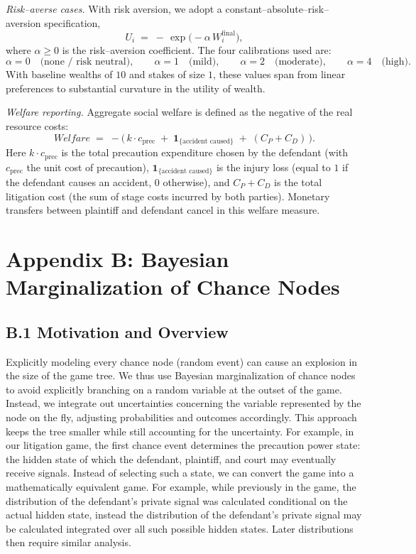 \documentclass{article}
\begin{document}
\emph{Risk–averse cases.} With risk aversion, we adopt a constant–absolute–risk–aversion specification,
\[
U_i \;=\; -\,\exp\!\bigl(-\alpha\,W_i^{\mathrm{final}}\bigr),
\]
where $\alpha\ge 0$ is the risk–aversion coefficient. The four calibrations used are:
\[
\alpha = 0 \quad\text{(none / risk neutral)},\qquad
\alpha = 1 \quad\text{(mild)},\qquad
\alpha = 2 \quad\text{(moderate)},\qquad
\alpha = 4 \quad\text{(high)}.
\]
With baseline wealths of $10$ and stakes of size $1$, these values span from linear preferences to substantial curvature in the utility of wealth.

\emph{Welfare reporting.} Aggregate social welfare is defined as the negative of the real resource costs:
\[
Welfare \;=\; -\bigl(\,k \cdot c_{\mathrm{prec}} \;+\; \mathbf{1}_{\{\text{accident caused}\}} \;+\; (C_P+C_D)\,\bigr).
\]
Here $k \cdot c_{\mathrm{prec}}$ is the total precaution expenditure chosen by the defendant (with $c_{\mathrm{prec}}$ the unit cost of precaution), $\mathbf{1}_{\{\text{accident caused}\}}$ is the injury loss (equal to $1$ if the defendant causes an accident, $0$ otherwise), and $C_P+C_D$ is the total litigation cost (the sum of stage costs incurred by both parties). Monetary transfers between plaintiff and defendant cancel in this welfare measure.

\section*{Appendix B: Bayesian Marginalization of Chance Nodes}

\subsection*{B.1 Motivation and Overview}

Explicitly modeling every chance node (random event) can cause an explosion in the size of the game tree. We thus use Bayesian marginalization of chance nodes to avoid explicitly branching on a random variable at the outset of the game. Instead, we integrate out uncertainties concerning the variable represented by the node on the fly, adjusting probabilities and outcomes accordingly. This approach keeps the tree smaller while still accounting for the uncertainty. For example, in our litigation game, the first chance event determines the precaution power state: the hidden state of which the defendant, plaintiff, and court may eventually receive signals. Instead of selecting such a state, we can convert the game into a mathematically equivalent game. For example, while previously in the game, the distribution of the defendant's private signal was calculated conditional on the actual hidden state, instead the distribution of the defendant's private signal may be calculated integrated over all such possible hidden states. Later distributions then require similar analysis. 
\end{document}
